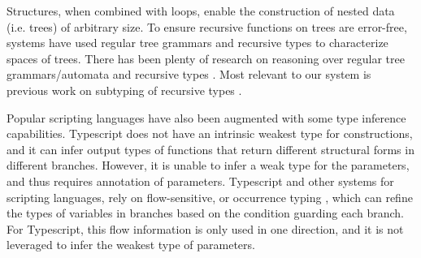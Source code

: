\documentclass[table,dvipsnames,acmsmall]{acmart}
\theoremstyle{definition}
\begin{document}
Structures, when combined with loops, enable the construction of nested data (i.e. trees) 
of arbitrary size. To ensure recursive functions on trees are error-free,
systems have used regular tree grammars and recursive types to characterize spaces of trees.
There has been plenty of research on reasoning over regular tree grammars/automata and recursive types \cite{}.
Most relevant to our system is previous work on subtyping of recursive types \cite{}.  







Popular scripting languages have also been augmented with some type inference capabilities.
Typescript \cite{} does not have an intrinsic weakest type for constructions,
and it can infer output types of functions that return different structural forms in different branches.
However, it is unable to infer a weak type for the parameters, and thus requires annotation of parameters.  
Typescript and other systems for scripting languages, rely on flow-sensitive, or occurrence typing \cite{},
which can refine the types of variables in branches based on the condition guarding each branch.
For Typescript, this flow information is only used in one direction, and it is not leveraged to infer
the weakest type of parameters.
\end{document}
